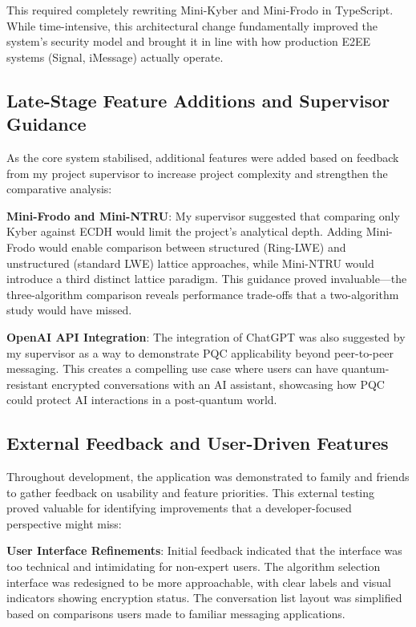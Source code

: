 \documentclass[11pt,a4paper]{article}
\begin{document}
This required completely rewriting Mini-Kyber and Mini-Frodo in TypeScript. While time-intensive, this architectural change fundamentally improved the system's security model and brought it in line with how production E2EE systems (Signal, iMessage) actually operate.

\subsection{Late-Stage Feature Additions and Supervisor Guidance}

As the core system stabilised, additional features were added based on feedback from my project supervisor to increase project complexity and strengthen the comparative analysis:

\textbf{Mini-Frodo and Mini-NTRU}: My supervisor suggested that comparing only Kyber against ECDH would limit the project's analytical depth. Adding Mini-Frodo would enable comparison between structured (Ring-LWE) and unstructured (standard LWE) lattice approaches, while Mini-NTRU would introduce a third distinct lattice paradigm. This guidance proved invaluable---the three-algorithm comparison reveals performance trade-offs that a two-algorithm study would have missed.

\textbf{OpenAI API Integration}: The integration of ChatGPT was also suggested by my supervisor as a way to demonstrate PQC applicability beyond peer-to-peer messaging. This creates a compelling use case where users can have quantum-resistant encrypted conversations with an AI assistant, showcasing how PQC could protect AI interactions in a post-quantum world.

\subsection{External Feedback and User-Driven Features}

Throughout development, the application was demonstrated to family and friends to gather feedback on usability and feature priorities. This external testing proved valuable for identifying improvements that a developer-focused perspective might miss:

\textbf{User Interface Refinements}: Initial feedback indicated that the interface was too technical and intimidating for non-expert users. The algorithm selection interface was redesigned to be more approachable, with clear labels and visual indicators showing encryption status. The conversation list layout was simplified based on comparisons users made to familiar messaging applications.
\end{document}
